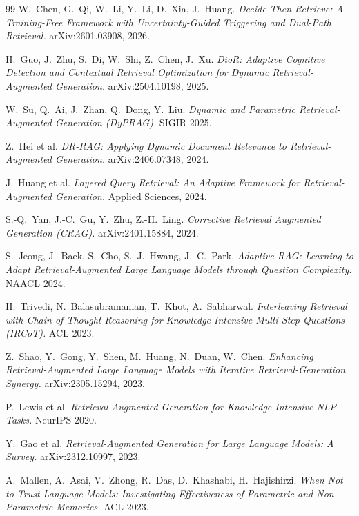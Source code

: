 \documentclass[11pt]{article}
\begin{document}
\begin{thebibliography}{99}
W.~Chen, G.~Qi, W.~Li, Y.~Li, D.~Xia, J.~Huang.
\textit{Decide Then Retrieve: A Training-Free Framework with
Uncertainty-Guided Triggering and Dual-Path Retrieval.} arXiv:2601.03908, 2026.

H.~Guo, J.~Zhu, S.~Di, W.~Shi, Z.~Chen, J.~Xu.
\textit{DioR: Adaptive Cognitive Detection and Contextual Retrieval
Optimization for Dynamic Retrieval-Augmented Generation.}
arXiv:2504.10198, 2025.

W.~Su, Q.~Ai, J.~Zhan, Q.~Dong, Y.~Liu.
\textit{Dynamic and Parametric Retrieval-Augmented Generation (DyPRAG).}
SIGIR 2025.

Z.~Hei et al.
\textit{DR-RAG: Applying Dynamic Document Relevance to
Retrieval-Augmented Generation.} arXiv:2406.07348, 2024.

J.~Huang et al.
\textit{Layered Query Retrieval: An Adaptive Framework for
Retrieval-Augmented Generation.} Applied Sciences, 2024.

S.-Q.~Yan, J.-C.~Gu, Y.~Zhu, Z.-H.~Ling.
\textit{Corrective Retrieval Augmented Generation (CRAG).}
arXiv:2401.15884, 2024.

S.~Jeong, J.~Baek, S.~Cho, S.~J.~Hwang, J.~C.~Park.
\textit{Adaptive-RAG: Learning to Adapt Retrieval-Augmented Large Language
Models through Question Complexity.} NAACL 2024.

H.~Trivedi, N.~Balasubramanian, T.~Khot, A.~Sabharwal.
\textit{Interleaving Retrieval with Chain-of-Thought Reasoning for
Knowledge-Intensive Multi-Step Questions (IRCoT).} ACL 2023.

Z.~Shao, Y.~Gong, Y.~Shen, M.~Huang, N.~Duan, W.~Chen.
\textit{Enhancing Retrieval-Augmented Large Language Models with Iterative
Retrieval-Generation Synergy.} arXiv:2305.15294, 2023.

P.~Lewis et al.
\textit{Retrieval-Augmented Generation for Knowledge-Intensive NLP Tasks.}
NeurIPS 2020.

Y.~Gao et al.
\textit{Retrieval-Augmented Generation for Large Language Models: A
Survey.} arXiv:2312.10997, 2023.

A.~Mallen, A.~Asai, V.~Zhong, R.~Das, D.~Khashabi, H.~Hajishirzi.
\textit{When Not to Trust Language Models: Investigating Effectiveness of
Parametric and Non-Parametric Memories.} ACL 2023.


\end{thebibliography}
\end{document}
